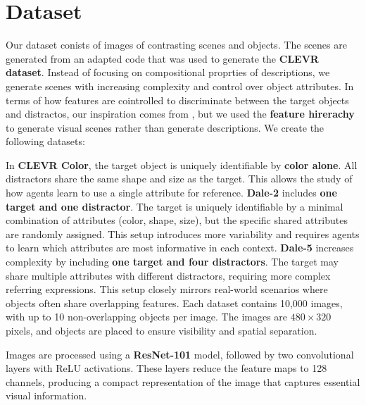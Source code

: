 \documentclass[11pt]{article}
\begin{document}
\section{Dataset} %

Our dataset conists of images of contrasting scenes and objects.  The
scenes are generated from an adapted code that was used to generate
the \textbf{CLEVR dataset}. Instead of focusing on compositional
proprties of descriptions, we generate scenes with increasing
complexity and control over object attributes. In terms of how
features are cointrolled to discriminate between the target objects
and distractos, our inspiration comes from \citep{Dale1995}, but we
used the \textbf{feature hirerachy} to generate visual scenes rather
than generate descriptions. We create the following datasets:

In \textbf{CLEVR Color}, the target object is uniquely identifiable by
\textbf{color alone}. All distractors share the same shape and size as
the target. %
This allows the study of how agents learn to use a
single attribute for reference.
%
\textbf{Dale-2}
includes \textbf{one
target and one distractor}. The target is uniquely identifiable by a
minimal combination of attributes (color, shape, size), but the specific
shared attributes are randomly assigned. This setup introduces more
variability and requires agents to learn which attributes are most
informative in each context.
%
\textbf{Dale-5} increases complexity by including \textbf{one target and
four distractors}. The target may share multiple attributes with
different distractors, requiring more complex referring expressions.
This setup closely mirrors real-world scenarios where objects often
share overlapping features.
%
Each dataset contains 10,000 images, with up to 10 non-overlapping
objects per image. The images are $480\times 320$ pixels, and objects are placed
to ensure visibility and spatial separation.


Images are processed using a \textbf{ResNet-101} model, followed by two
convolutional layers with ReLU activations. These layers reduce the
feature maps to 128 channels, producing a compact representation of the
image that captures essential visual information.
\end{document}
